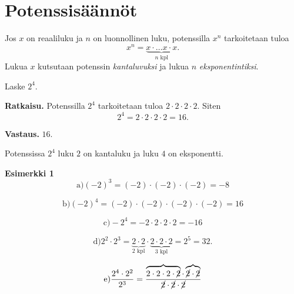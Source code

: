 \chapter{Potenssisäännöt}


Jos $x$ on reaaliluku ja $n$ on luonnollinen luku, potenssilla $x^n$ tarkoitetaan tuloa
\[
x^n = \underbrace{x\cdot \ldots x\cdot x}_{n\text{ kpl}}. 
\]
Lukua $x$ kutsutaan potenssin \emph{kantaluvuksi} ja lukua $n$ \emph{eksponentintiksi}.


\begin{esimerkki}
Laske $2^4$.

{\bf Ratkaisu.}
Potenssilla $2^4$ tarkoitetaan tuloa $2\cdot 2\cdot 2\cdot 2$. Siten
\[
2^4=2\cdot 2\cdot 2\cdot 2=16.
\]

{\bf Vastaus.} $16$.
\end{esimerkki}

Potenssissa $2^4$ luku $2$ on kantaluku ja luku $4$ on eksponentti.

\begin{esimerkki}
\textbf{Esimerkki 1}
\begin{equation}
\text{a)} (-2)^3=(-2)\cdot (-2)\cdot (-2)=-8
\end{equation}

\begin{equation}
\text{b)} (-2)^4=(-2)\cdot (-2)\cdot (-2)\cdot (-2)=16
\end{equation}

\begin{equation}
\text{c)} -2^4=-2\cdot 2\cdot 2\cdot 2=-16
\end{equation}

\begin{equation}
\text{d)} 2^2\cdot 2^3=\underbrace{2\cdot 2}_{2\textrm{ kpl}}\cdot \underbrace{2\cdot 2\cdot 2}_{3\textrm{ kpl}}=2^5=32.
\end{equation}

\begin{equation}
\text{e)}\frac{2^4\cdot 2^2}{2^3}=\frac{\overbrace{2\cdot 2\cdot 2\cdot \cancel{2}}\cdot \overbrace{\cancel{2}\cdot \cancel{2}}}{\cancel{2}\cdot \cancel{2}\cdot \cancel{2}}
\end{equation}
\end{esimerkki}


